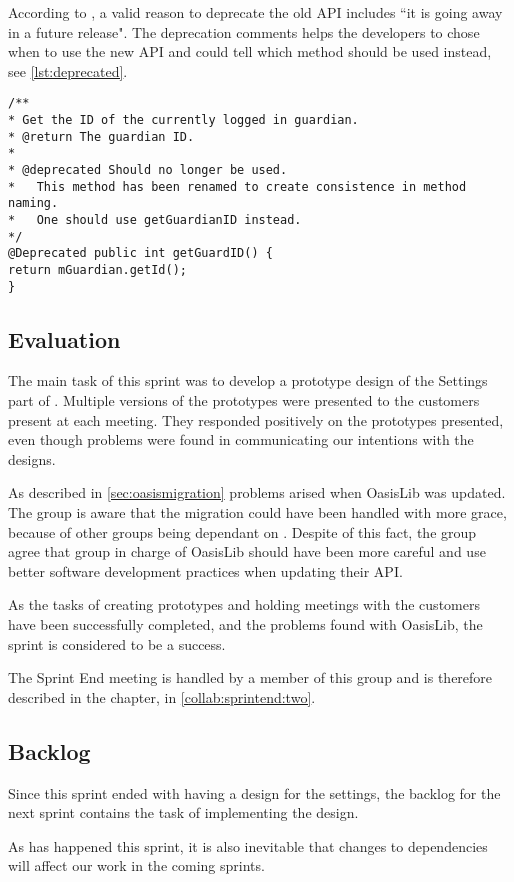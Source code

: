 According to \citet{deprecatedreference}, a valid reason to deprecate the old API includes ``it is going away in a future release". The deprecation comments helps the developers to chose when to use the new API and could tell which method should be used instead, see \cref{lst:deprecated}.

\begin{lstlisting}[caption={Example of a deprecated method could look like this.}, label={lst:deprecated}]
/**
* Get the ID of the currently logged in guardian.
* @return The guardian ID.
* 
* @deprecated Should no longer be used.
* 	This method has been renamed to create consistence in method naming.
*	One should use getGuardianID instead.
*/
@Deprecated public int getGuardID() {
return mGuardian.getId();
}
\end{lstlisting}

\subsection{Evaluation}

The main task of this sprint was to develop a prototype design of the Settings part of \launcher.
Multiple versions of the prototypes were presented to the customers present at each meeting.
They responded positively on the prototypes presented, even though problems were found in communicating our intentions with the designs.

As described in \cref{sec:oasismigration} problems arised when OasisLib was updated.
The group is aware that the migration could have been handled with more grace, because of other groups being dependant on \launcher.
Despite of this fact, the group agree that group in charge of OasisLib should have been more careful and use better software development practices when updating their API.

As the tasks of creating prototypes and holding meetings with the customers have been successfully completed, and the problems found with OasisLib, the sprint is considered to be a success.

The Sprint End meeting is handled by a member of this group and is therefore described in the  chapter, in \cref{collab:sprintend:two}.

\subsection{Backlog}

Since this sprint ended with having a design for the settings, the backlog for the next sprint contains the task of implementing the design.

As has happened this sprint, it is also inevitable that changes to dependencies will affect our work in the coming sprints.